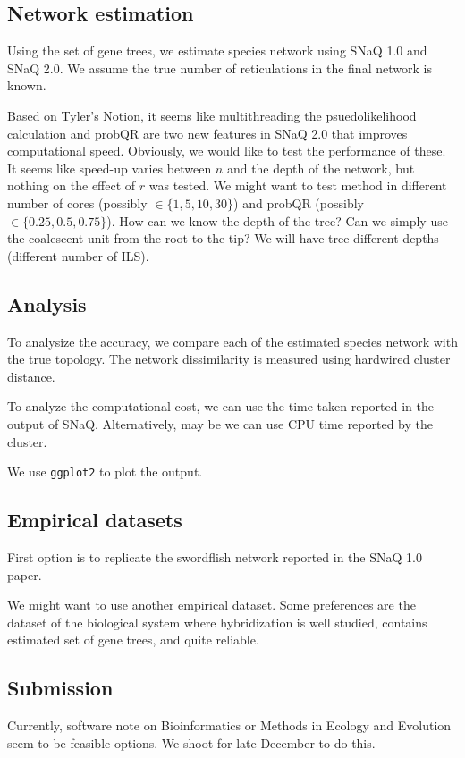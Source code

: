 \documentclass{article}
\begin{document}
\subsection{Network estimation}
Using the set of gene trees, we estimate species network using SNaQ 1.0 and SNaQ 2.0. We assume the true number of reticulations in the final network is known.

Based on Tyler's Notion, it seems like multithreading the psuedolikelihood calculation and probQR are two new features in SNaQ 2.0 that improves computational speed. Obviously, we would like to test the performance of these. It seems like speed-up varies between $n$ and the depth of the network, but nothing on the effect of $r$ was tested. We might want to test method in different number of cores (possibly $\in \{1, 5, 10, 30\}$) and probQR (possibly $\in \{0.25, 0.5, 0.75\}$). How can we know the depth of the tree? Can we simply use the coalescent unit from the root to the tip? We will have tree different depths (different number of ILS).

\subsection{Analysis}
To analysize the accuracy, we compare each of the estimated species network with the true topology. The network dissimilarity is measured using hardwired cluster distance. 

To analyze the computational cost, we can use the time taken reported in the output of SNaQ. Alternatively, may be we can use CPU time reported by the cluster.

We use \texttt{ggplot2} to plot the output.

\subsection{Empirical datasets}
First option is to replicate the swordflish network reported in the SNaQ 1.0 paper.

We might want to use another empirical dataset. Some preferences are the dataset of the biological system where hybridization is well studied, contains estimated set of gene trees, and quite reliable.

\subsection{Submission}
Currently, software note on Bioinformatics or Methods in Ecology and Evolution seem to be feasible options. We shoot for late December to do this.
\end{document}

